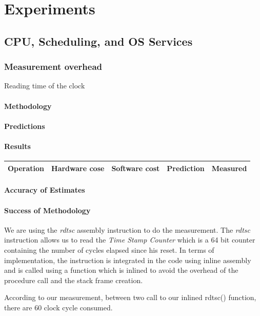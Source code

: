 \section{Experiments}

\subsection{CPU, Scheduling, and OS Services}

\subsubsection{Measurement overhead}

Reading time of the clock
\paragraph{Methodology}
\paragraph{Predictions}
\paragraph{Results}

\begin{tabular}{| l | l | l | l | l |}
\hline
Operation & Hardware cose & Software cost & Prediction & Measured \\
\hline
\end{tabular}
\paragraph{Accuracy of Estimates}
\paragraph{Success of Methodology}
We are using the \emph{rdtsc} assembly instruction to do the measurement.
The \emph{rdtsc} instruction allows us to read the \emph{Time Stamp Counter}
which is a 64 bit counter containing the number of cycles elapsed since his
reset.
In terms of implementation, the instruction is integrated in the code using
inline assembly and is called using a function which is inlined to avoid the
overhead of the procedure call and the stack frame creation.

According to our measurement, between two call to our inlined rdtsc() function,
there are 60 clock cycle consumed.

